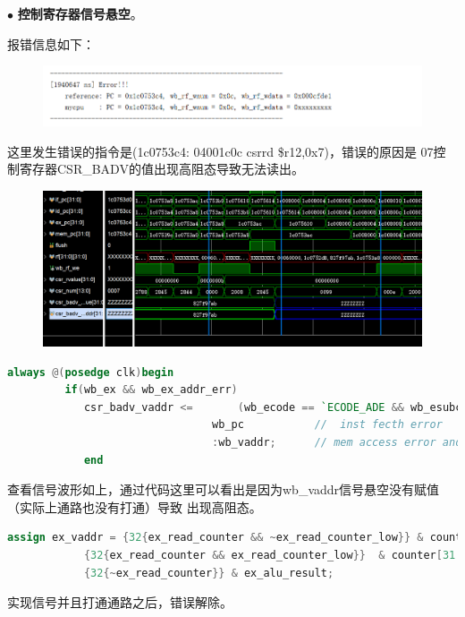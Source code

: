 \documentclass[11pt]{article}
\begin{document}
          \noindent
          $\bullet$
          \textbf{控制寄存器信号悬空}。
        
          报错信息如下：
          \begin{figure}[H]
            \centering
            \includegraphics[width=15cm]{fig/24.png}
          \end{figure}

          这里发生错误的指令是(1c0753c4:	04001c0c 	csrrd	\$r12,0x7)，错误的原因是
          07控制寄存器CSR_BADV的值出现高阻态导致无法读出。
          \begin{figure}[H]
            \centering
            \includegraphics[width=15cm]{fig/25.png}
          \end{figure}

          \begin{lstlisting}[language=verilog]
        always @(posedge clk)begin
         if(wb_ex && wb_ex_addr_err)
            csr_badv_vaddr <=       (wb_ecode == `ECODE_ADE && wb_esubcode == `ESUBCODE_ADEF) ?
                                wb_pc           //  inst fecth error
                                :wb_vaddr;      // mem access error and so on
            end
          \end{lstlisting}
          查看信号波形如上，通过代码这里可以看出是因为wb_vaddr信号悬空没有赋值（实际上通路也没有打通）导致
          出现高阻态。
           \begin{lstlisting}[language=verilog]
            assign ex_vaddr = {32{ex_read_counter && ~ex_read_counter_low}} & counter[63:32] | 
            {32{ex_read_counter && ex_read_counter_low}}  & counter[31: 0] |
            {32{~ex_read_counter}} & ex_alu_result;
          \end{lstlisting}
         实现信号并且打通通路之后，错误解除。
          
\end{document}
